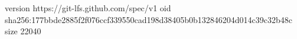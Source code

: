 version https://git-lfs.github.com/spec/v1
oid sha256:177bbde2885f2f076ccf339550cad198d38405b0b132846204d014c39c32b48c
size 22040
